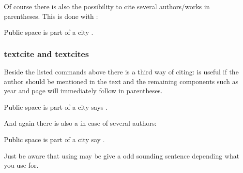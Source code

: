 \documentclass[a4paper,
10pt,
greek,
french,
spanish,
italian,
ngerman,
english
]{ltxdoc}
\begin{document}
\DescribeMacro{\parencites}
Of course there is also the possibility to cite several authors/works in parentheses.
This is done with :
\begin{example}
Public space is part of a city \parencites(cf.)(){Osland2016}{Evangelidis2014}.
\end{example}

\subsubsection{textcite and textcites}
\DescribeMacro{\textcite}
Beside the listed  commands above there is a third way of citing:
 is useful if the author should be mentioned in the text and
the remaining components such as year and page will immediately follow in parentheses. 

\begin{example}
Public space is part of a city says \textcite{Osland2016}.
\end{example}

\DescribeMacro{\textcites}
And again there is also a  in case of several authors: 
\begin{example}
Public space is part of a city say \textcites{Osland2016}[cf.][]{Evangelidis2014}.
\end{example}
Just be aware that using  may be give a odd sounding sentence depending what you use  for.
\end{document}
